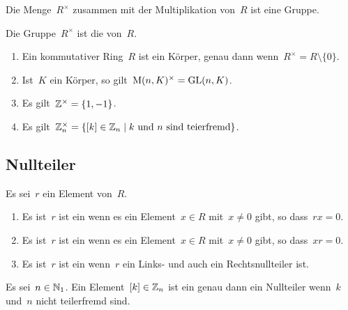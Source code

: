 \begin{proposition}
  Die Menge~$R^\times$ zusammen mit der Multiplikation von~$R$ ist eine Gruppe.
\end{proposition}

\begin{definition}
  Die Gruppe~$R^\times$ ist die  von~$R$.
\end{definition}

\begin{example}
  \leavevmode
  \begin{enumerate}
    \item
      Ein kommutativer Ring~$R$ ist ein Körper, genau dann wenn~$R^\times = R \setminus \{ 0 \}$.
    \item
      Ist~$K$ ein Körper, so gilt~$\operatorname{M}(n, K)^\times = \operatorname{GL}(n,K)$.
    \item
      Es gilt~$\mathbb{Z}^\times = \{1, -1\}$.
    \item
      Es gilt~$\Integer_n^\times = \{ \class{k} \in \Integer_n \suchthat \text{$k$ und~$n$ sind teierfremd} \}$.
  \end{enumerate}
\end{example}



\subsection{Nullteiler}

\begin{definition}
  Es sei~$r$ ein Element von~$R$.
  \begin{enumerate}
    \item
      Es ist~$r$ ist ein  wenn es ein Element~$x \in R$ mit~$x \neq 0$ gibt, so dass~$rx = 0$.
    \item
      Es ist~$r$ ist ein  wenn es ein Element~$x \in R$ mit~$x \neq 0$ gibt, so dass~$xr = 0$.
    \item
      Es ist~$r$ ist ein  wenn~$r$ ein Links- und auch ein Rechtsnullteiler ist.
  \end{enumerate}
\end{definition}

\begin{example}
  Es sei~$n \in \mathbb{N}_1$.
  Ein Element~$[k] \in \mathbb{Z}_n$ ist ein genau dann ein Nullteiler wenn~$k$ und~$n$ nicht teilerfremd sind.
\end{example}

